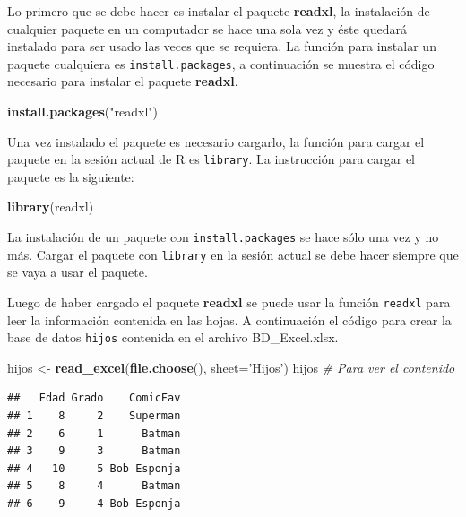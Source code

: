\documentclass[10pt,]{krantz}
\makeatletter
\newenvironment{Shaded}{\begin{snugshade}}{\end{snugshade}}
\newcommand{\KeywordTok}[1]{\textcolor[rgb]{0.13,0.29,0.53}{\textbf{{#1}}}}
\newcommand{\DataTypeTok}[1]{\textcolor[rgb]{0.13,0.29,0.53}{{#1}}}
\newcommand{\StringTok}[1]{\textcolor[rgb]{0.31,0.60,0.02}{{#1}}}
\newcommand{\CommentTok}[1]{\textcolor[rgb]{0.56,0.35,0.01}{\textit{{#1}}}}
\newcommand{\NormalTok}[1]{{#1}}
\let\proglang=\textsf
\newenvironment{kframe}{%
\medskip{}
\setlength{\fboxsep}{.8em}
 \def\at@end@of@kframe{}%
 \ifinner\ifhmode%
  \def\at@end@of@kframe{\end{minipage}}%
  \begin{minipage}{\columnwidth}%
 \fi\fi%
 \def\FrameCommand##1{\hskip\@totalleftmargin \hskip-\fboxsep
 \colorbox{shadecolor}{##1}\hskip-\fboxsep
     \hskip-\linewidth \hskip-\@totalleftmargin \hskip\columnwidth}%
 \MakeFramed {\advance\hsize-\width
   \@totalleftmargin\z@ \linewidth\hsize
   \@setminipage}}%
 {\par\unskip\endMakeFramed%
 \at@end@of@kframe}
\renewenvironment{Shaded}{\begin{kframe}}{\end{kframe}}
\let\BeginKnitrBlock\begin \let\EndKnitrBlock\end
\makeatother
\begin{document}
Lo primero que se debe hacer es instalar el paquete \textbf{readxl}, la
instalación de cualquier paquete en un computador se hace una sola vez y
éste quedará instalado para ser usado las veces que se requiera. La
función para instalar un paquete cualquiera es
\texttt{install.packages}, a continuación se muestra el código necesario
para instalar el paquete \textbf{readxl}.

\begin{Shaded}
\begin{Highlighting}[]
\KeywordTok{install.packages}\NormalTok{(}\StringTok{"readxl"}\NormalTok{)}
\end{Highlighting}
\end{Shaded}

Una vez instalado el paquete es necesario cargarlo, la función para
cargar el paquete en la sesión actual de \proglang{R} es
\texttt{library}. La instrucción para cargar el paquete es la siguiente:

\begin{Shaded}
\begin{Highlighting}[]
\KeywordTok{library}\NormalTok{(readxl)}
\end{Highlighting}
\end{Shaded}

\BeginKnitrBlock{rmdwarning}
La instalación de un paquete con \texttt{install.packages} se hace sólo
una vez y no más. Cargar el paquete con \texttt{library} en la sesión
actual se debe hacer siempre que se vaya a usar el paquete.
\EndKnitrBlock{rmdwarning}

Luego de haber cargado el paquete \textbf{readxl} se puede usar la
función \texttt{readxl} para leer la información contenida en las hojas.
A continuación el código para crear la base de datos \texttt{hijos}
contenida en el archivo BD\_Excel.xlsx.

\begin{Shaded}
\begin{Highlighting}[]
\NormalTok{hijos <-}\StringTok{ }\KeywordTok{read_excel}\NormalTok{(}\KeywordTok{file.choose}\NormalTok{(), }\DataTypeTok{sheet=}\StringTok{'Hijos'}\NormalTok{)}
\NormalTok{hijos  }\CommentTok{# Para ver el contenido}
\end{Highlighting}
\end{Shaded}

\begin{verbatim}
##   Edad Grado    ComicFav
## 1    8     2    Superman
## 2    6     1      Batman
## 3    9     3      Batman
## 4   10     5 Bob Esponja
## 5    8     4      Batman
## 6    9     4 Bob Esponja
\end{verbatim}
\end{document}
